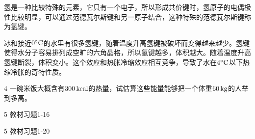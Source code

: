 \documentclass[CJK]{beamer}
\begin{document}
\begin{frame}
\bch
氢是一种比较特殊的元素，它只有一个电子，所以形成共价键时，氢原子的电偶极性比较明显，可以通过范德瓦尔斯键和另一原子结合，这种特殊的范德瓦尔斯键称为氢键。

\skipline

冰和接近$0^\circ \mathrm{C}$的水里有很多氢键，随着温度升高氢键被破坏而变得越来越少。氢键使得水分子容易排列成空旷的六角晶格，所以氢键越多，体积越大。随着温度升高氢键断裂，体积变小。这个效应和热胀冷缩效应相互竞争，导致了水在$4^\circ \mathrm{C}$以下热缩冷胀的奇特性质。


\ech
\end{frame}


\begin{frame}
\bch
\bitem
\item[4]{一碗米饭大概含有$300\,\mathrm{kcal}$的热量，试估算这些能量能够把一个体重$60\,\mathrm{kg}$的人举到多高。}
\item[5]{教材习题1-16}
\item[5]{教材习题1-20}
\eitem
\ech
\end{frame}
\end{document}
